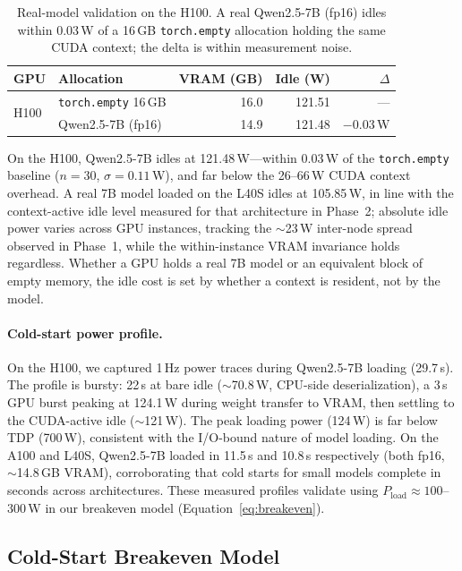 \documentclass[sigconf,nonacm]{acmart}
\begin{document}
\begin{table}[t]
\caption{Real-model validation on the H100. A real Qwen2.5-7B (fp16) idles within 0.03\,W of a 16\,GB \texttt{torch.empty} allocation holding the same CUDA context; the delta is within measurement noise.}
\label{tab:validation}
\small
\begin{tabular}{@{}llrrr@{}}
\toprule
\textbf{GPU} & \textbf{Allocation} & \textbf{VRAM (GB)} & \textbf{Idle (W)} & $\Delta$ \\
\midrule
\multirow{2}{*}{H100} & \texttt{torch.empty} 16\,GB & 16.0 & 121.51 & --- \\
 & Qwen2.5-7B (fp16) & 14.9 & 121.48 & $-$0.03\,W \\
\bottomrule
\end{tabular}
\end{table}

On the H100, Qwen2.5-7B idles at 121.48\,W---within 0.03\,W of the \texttt{torch.empty} baseline ($n=30$, $\sigma = 0.11$\,W), and far below the 26--66\,W CUDA context overhead. A real 7B model loaded on the L40S idles at 105.85\,W, in line with the context-active idle level measured for that architecture in Phase~2; absolute idle power varies across GPU instances, tracking the $\sim$23\,W inter-node spread observed in Phase~1, while the within-instance VRAM invariance holds regardless. Whether a GPU holds a real 7B model or an equivalent block of empty memory, the idle cost is set by whether a context is resident, not by the model.

\paragraph{Cold-start power profile.} On the H100, we captured 1\,Hz power traces during Qwen2.5-7B loading (29.7\,s). The profile is bursty: 22\,s at bare idle ($\sim$70.8\,W, CPU-side deserialization), a 3\,s GPU burst peaking at 124.1\,W during weight transfer to VRAM, then settling to the CUDA-active idle ($\sim$121\,W). The peak loading power (124\,W) is far below TDP (700\,W), consistent with the I/O-bound nature of model loading. On the A100 and L40S, Qwen2.5-7B loaded in 11.5\,s and 10.8\,s respectively (both fp16, $\sim$14.8\,GB VRAM), corroborating that cold starts for small models complete in seconds across architectures. These measured profiles validate using $P_{\text{load}} \approx 100$--$300$\,W in our breakeven model (Equation~\ref{eq:breakeven}).

\subsection{Cold-Start Breakeven Model}
\end{document}
